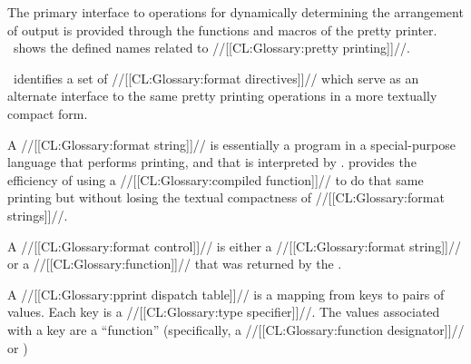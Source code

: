 \endsubsubsection%


The primary interface to operations for dynamically determining the arrangement of output is provided through the functions and macros of the pretty printer.  \Thenextfigure\ shows the defined names related to //[[CL:Glossary:pretty printing]]//.


\Thenextfigure\ identifies a set of //[[CL:Glossary:format directives]]// which serve as an alternate interface to the same pretty printing operations in a  more textually compact form.


\endsubsubsection%

 

 A //[[CL:Glossary:format string]]// is essentially a program in a special-purpose language that performs printing, and that is interpreted by .  provides the efficiency of using a //[[CL:Glossary:compiled function]]//  to do that same printing but without losing the textual compactness of //[[CL:Glossary:format strings]]//.

A //[[CL:Glossary:format control]]// is either a //[[CL:Glossary:format string]]// or a //[[CL:Glossary:function]]// that was returned by the .

\endsubsubsection%

 

A //[[CL:Glossary:pprint dispatch table]]// is a mapping from keys to pairs of values.   Each key is a //[[CL:Glossary:type specifier]]//.   The values associated with a key are
     a ``function'' (specifically, a //[[CL:Glossary:function designator]]// or \nil)


